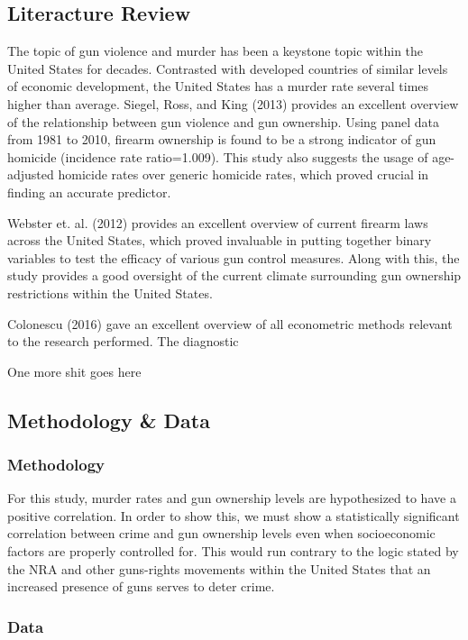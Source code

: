 \documentclass[floatsintext,mask,man]{apa6}
\theoremstyle{definition}
\theoremstyle{definition}
\theoremstyle{definition}
\theoremstyle{remark}
\begin{document}
\subsection{Literacture Review}\label{literacture-review}

The topic of gun violence and murder has been a keystone topic within
the United States for decades. Contrasted with developed countries of
similar levels of economic development, the United States has a murder
rate several times higher than average. Siegel, Ross, and King (2013)
provides an excellent overview of the relationship between gun violence
and gun ownership. Using panel data from 1981 to 2010, firearm ownership
is found to be a strong indicator of gun homicide (incidence rate
ratio=1.009). This study also suggests the usage of age-adjusted
homicide rates over generic homicide rates, which proved crucial in
finding an accurate predictor.

Webster et. al. (2012) provides an excellent overview of current firearm
laws across the United States, which proved invaluable in putting
together binary variables to test the efficacy of various gun control
measures. Along with this, the study provides a good oversight of the
current climate surrounding gun ownership restrictions within the United
States.

Colonescu (2016) gave an excellent overview of all econometric methods
relevant to the research performed. The diagnostic

One more shit goes here

\subsection{Methodology \& Data}\label{methodology-data}

\subsubsection{Methodology}\label{methodology}

For this study, murder rates and gun ownership levels are hypothesized
to have a positive correlation. In order to show this, we must show a
statistically significant correlation between crime and gun ownership
levels even when socioeconomic factors are properly controlled for. This
would run contrary to the logic stated by the NRA and other guns-rights
movements within the United States that an increased presence of guns
serves to deter crime.

\subsubsection{Data}\label{data}
\end{document}
